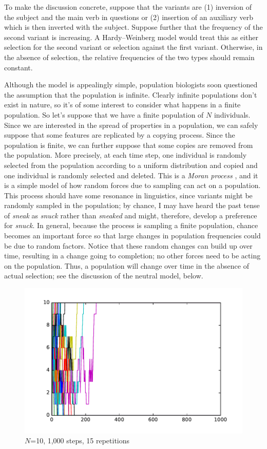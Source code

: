 \documentclass[output=paper]{langsci/langscibook}
\begin{document}
To make the discussion concrete, suppose that the variants are (1)
inversion of the subject and the main verb in questions or (2)
insertion of an auxiliary verb which is then inverted with the
subject.  Suppose further that the frequency of the second variant
is increasing.  A Hardy--Weinberg model would treat this as either
selection for the second variant or selection against the first
variant.  Otherwise, in the absence of selection, the relative
frequencies of the two types should remain constant.

Although the model is appealingly simple, population biologists soon
questioned the assumption that the population is infinite. Clearly
infinite populations don't exist in nature, so it's of some interest to
consider what happens in a finite population.  So let's suppose that
we have a finite population of $N$ individuals.  Since we are
interested in the spread of properties in a population, we can safely
suppose that some features are replicated by a copying process.  Since
the population is finite, we can further suppose that some copies are
removed from the population.  More precisely, at each time step, one
individual is randomly selected from the population according to a
uniform distribution and copied and one individual is randomly
selected and deleted.  This is a \emph{Moran process}
\citep{moran:1958}, and it is a simple model of how random forces due
to sampling can act on a population.  This process should have some
resonance in linguistics, since variants might be randomly sampled in
the population; by chance, I may have heard the past tense of
\emph{sneak} as \emph{snuck} rather than \emph{sneaked} and might,
therefore, develop a preference for \emph{snuck}.  In general, because
the process is sampling a finite population, chance becomes an
important force so that large changes in population frequencies could
be due to random factors.  Notice that these random changes can build
up over time, resulting in a change going to completion; no other
forces need to be acting on the population.  Thus, a population will
change over time in the absence of actual selection; see the
discussion of the neutral model, below.

\begin{figure}[ht]
  \centering
  \includegraphics[width=.8\linewidth]{./img/pop10_1000.pdf}
  \caption{$N$=10, 1,000 steps, 15 repetitions}
  \label{random_fig1}
\end{figure}
\end{document}
